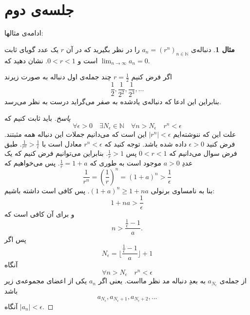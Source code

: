 \documentclass[12pt,a4paper]{article}
\theoremstyle{definition}
\newtheorem{mesal}[thm]{مثال}
\begin{document}
\section*{جلسه‌ی دوم}
ادامه‌ی مثالها:
\begin{mesal}
دنباله‌ی 
$a_n=(r^n)_{n\in \mathbb{N}}$
را در نظر بگیرید که در آن 
$r$
یک عدد گویای ثابت است و 
$0<r<1$.
نشان دهید که 
$\lim_{n \to \infty}a_n=0$.
\end{mesal}
اگر فرض کنیم
$r=\frac{1}{2}$
چند جمله‌ی اول دنباله به صورت زیرند
\[
\frac{1}{2},\frac{1}{2^2},\frac{1}{2^3},...
\]
بنابراین این ادعا که دنباله‌ی یادشده به صفر می‌گراید درست به نظر می‌رسد.
\begin{proof}[پاسخ]
باید ثابت کنیم که 
\[
\forall \epsilon >0 \quad \exists N_\epsilon \in \mathbb{N} \quad \forall n>N_\epsilon \quad r^n < \epsilon
\]
علت این که ننوشته‌ایم
$|r^n|<\epsilon$
این است که می‌دانیم جملات این دنباله همه مثبتند.
فرض کنید 
$\epsilon >0$
داده شده باشد.
توجه کنید که 
$r^n<\epsilon$
معادل است با 
$\frac{1}{r^n}> \frac{1}{\epsilon}$.
طبق فرض سوال می‌دانیم که
$0<r<1$
پس
$\frac{1}{r}>1$.
بنابراین می‌توانیم فرض کنیم که یک عددِ
$a>0$
موجود است به طوری که
$\frac{1}{r}=1+a$.
پس می‌خواهیم که
\[
 \frac{1}{r^n}={(\frac{1}{r})}^n={(1+a)}^n > \frac{1}{\epsilon}
\]
بنا به نامساوی برنولی
$(1+a)^n \geqslant 1+na$.
پس
کافی است داشته باشیم: 
\[
1+na>\frac{1}{\epsilon} 
\]
و برای آن کافی است که
\[
n>\frac{\frac{1}{\epsilon}-1}{a}.
\]
پس اگر
\[
N_\epsilon = \lfloor \frac{\frac{1}{\epsilon}-1}{a} \rfloor +1
\]
آنگاه
\[
\forall n>N_\epsilon \quad r^n <\epsilon
\]
از جمله‌ی 
$a_{N_\epsilon}$
به بعدِ دنباله مد نظر مااست. یعنی اگر
$a_n$
یکی از اعضای مجموعه‌ی زیر باشد 
\[
a_{N_\epsilon},a_{N_\epsilon+1},a_{N_\epsilon+2},\ldots 
\]
آنگاه 
$|a_n|<\epsilon$.
\end{proof}
\end{document}
